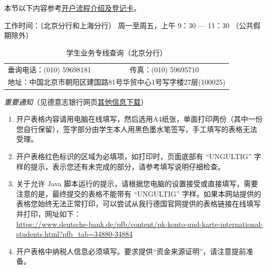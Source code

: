\documentclass{article}
\begin{document}
本节以下内容参考\href{https://china.db.com/china/docs/Deutsche_Bank-China-Account-Opening-Process-And-Introduction.pdf}{开户流程介绍及登记卡}。

工作时间：（北京分行和上海分行） 周一至周五，上午 9：30 --- 11：30 （公共假期除外）

\begin{table}[htbp]
\caption{学生业务专线查询（北京分行）}
\label{tb:bank-communication}
\centering
\begin{tabular}{ll}
  垂询电话：(010) 59698181 & 传真：(010) 59695710 \\
  \multicolumn{2}{l}{地址：中国北京市朝阳区建国路81号华贸中心1号写字楼27层(100025)}
\end{tabular}  
\end{table}

\emph{重要通知}（见德意志银行网页\href{https://china.db.com/china/cn/content/5777.html}{其他信息下载}）
\begin{enumerate}
\item 开户表格内容请用电脑在线填写，然后选用A4纸张，单面打印两份（其中一份您自行保留），签字部分由学生本人用黑色墨水笔签写，手工填写的表格无法受理。
\item 开户表格红色标识的区域为必填项，如打印时，页面底部有 ``UNGULTIG'' 字样的提示，表示您还有未完成的部分，请参考填写说明仔细检查。
\item \sloppy 关于允许 Java 脚本运行的提示，请根据您电脑的设置接受或直接填写，需要注意的是，最终提交的表格不能带有 ``UNGULTIG'' 字样。如果本网站提供的表格您始终无法正常打印，可以尝试从我行德国官网提供的表格链接在线填写并打印，网址如下：\\
\url{https://www.deutsche-bank.de/pfb/content/pk-konto-und-karte-international-students.html?pfb_tab=34880-34884}
\item 开户表格中纳税人信息必须填写。要求提供“资金来源证明”，请注意提前准备。
\end{enumerate}
\end{document}
